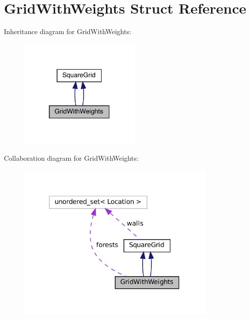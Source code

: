 \hypertarget{struct_grid_with_weights}{}\section{Grid\+With\+Weights Struct Reference}
\label{struct_grid_with_weights}


Inheritance diagram for Grid\+With\+Weights\+:\nopagebreak
\begin{figure}[H]
\begin{center}
\leavevmode
\includegraphics[width=172pt]{struct_grid_with_weights__inherit__graph}
\end{center}
\end{figure}


Collaboration diagram for Grid\+With\+Weights\+:\nopagebreak
\begin{figure}[H]
\begin{center}
\leavevmode
\includegraphics[width=279pt]{struct_grid_with_weights__coll__graph}
\end{center}
\end{figure}
